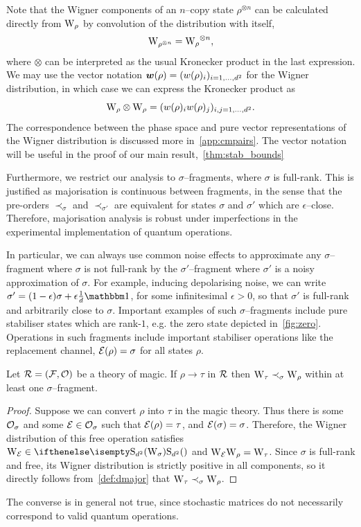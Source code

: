 \documentclass[pra,
aps,
twocolumn,
superscriptaddress,
groupedaddress,
nofootinbib,
reprint
]{revtex4-1}
\begin{document}
Note that the Wigner components of an $n$--copy state $\rho^{\otimes n}$ can be calculated directly from $\W{\rho}$ by convolution of the distribution with itself,
\begin{equation}
	\W{\rho^{\otimes n}} = \W{\rho}^{\otimes n},
\end{equation}
where $\otimes$ can be interpreted as the usual Kronecker product in the last expression.
We may use the vector notation $\bm{w}(\rho) = (w(\rho)_i)_{i=1,\dots,d^2}$ for the Wigner distribution, in which case we can express the Kronecker product as
\begin{equation}
	\W{\rho} \otimes \W{\rho} = (w(\rho)_i w(\rho)_j)_{i,j=1,\dots,d^2}.
\end{equation}
The correspondence between the phase space and pure vector representations of the Wigner distribution is discussed more in~\cref{app:cmpairs}.
The vector notation will be useful in the proof of our main result,~\cref{thm:stab_bounds}

Furthermore, we restrict our analysis to $\sigma$--fragments, where $\sigma$ is full-rank.
This is justified as majorisation is continuous between fragments, in the sense that the pre-orders $\prec_\sigma$ and $\prec_{\sigma'}$ are equivalent for states $\sigma$ and $\sigma'$ which are $\epsilon$--close. 
Therefore, majorisation analysis is robust under imperfections in the experimental implementation of quantum operations.

In particular, we can always use common noise effects to approximate any $\sigma$--fragment where $\sigma$ is not full-rank by the $\sigma'$--fragment where $\sigma'$ is a noisy approximation of $\sigma$. 
For example, inducing depolarising noise, we can write $\sigma' = (1-\epsilon)\sigma + \epsilon\frac{1}{d}\id$, for some infinitesimal $\epsilon > 0$, so that $\sigma'$ is full-rank and arbitrarily close to $\sigma$.
Important examples of such $\sigma$--fragments include pure stabiliser states which are rank-$1$, e.g. the zero state depicted in~\cref{fig:zero}. 
Operations in such fragments include important stabiliser operations like the replacement channel, $\mathcal{E}(\rho) = \sigma$ for all states $\rho$.

\begin{theorem}\label{thm:sigmamajor}
    Let $\mathcal{R} = (\mathcal{F}, \mathcal{O})$ be a theory of magic. If $\rho \longrightarrow \tau$  in $\mathcal{R}$ then  $\W{\tau} \prec_\sigma \W{\rho}$ within at least one $\sigma$--fragment.
\end{theorem}
\begin{proof}
Suppose we can convert $\rho$ into $\tau$ in the magic theory. 
Thus there is some $\mathcal{O}_\sigma$ and some $\mathcal{E} \in \mathcal{O}_\sigma$ such that $\mathcal{E}(\rho) = \tau$, and $\mathcal{E}(\sigma)=\sigma$. 
Therefore, the Wigner distribution of this free operation satisfies $\W{\E} \in \stochw$ and $\W{\E}\W{\rho} = \W{\tau}$. 
Since $\sigma$ is full-rank and free, its Wigner distribution is strictly positive in all components, so it directly follows from~\cref{def:dmajor} that $\W{\tau} \prec_{\sigma} \W{\rho}$.
\end{proof}
The converse is in general not true, since stochastic matrices do not necessarily correspond to valid quantum operations.
\end{document}
